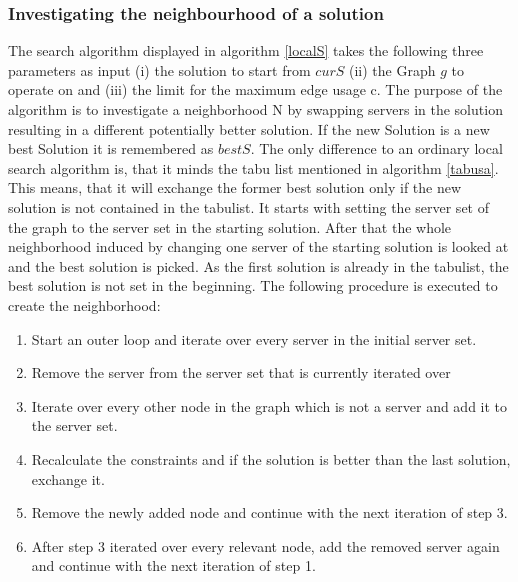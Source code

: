 \documentclass [12pt]{article}
\begin{document}
\subsubsection{Investigating the neighbourhood of a solution }
The search algorithm displayed in algorithm \ref{localS} takes
the following three parameters as input (i) the solution to start from $curS$
(ii) the Graph $g$ to operate on and (iii) the limit for the maximum edge usage c.
The purpose of the algorithm is to investigate a neighborhood N by swapping servers in the solution
resulting in a different potentially better solution. If the new Solution is a new best Solution it is remembered as $bestS$.
The only difference to an ordinary local search algorithm is, that it minds the tabu list mentioned in algorithm \ref{tabusa}.
This means, that it will exchange the former best solution only if the new solution is not contained in the tabulist.
It starts with setting the server set of the graph to the server set in the starting solution. After that the whole
neighborhood induced by changing one server of the starting solution is looked at and the best solution is picked. As the first solution
is already in the tabulist, the best solution is not set in the beginning.
The following procedure is executed to create the neighborhood:
\begin{enumerate}
  \item{Start an outer loop and iterate over every server in the initial server set.}
  \item{Remove the server from the server set that is currently iterated over}
  \item{Iterate over every other node in the graph which is not a server and add it to the server set.}
  \item{Recalculate the constraints and if the solution is better than the last solution, exchange it.}
  \item{Remove the newly added node and continue with the next iteration of step 3.}
  \item{After step 3 iterated over every relevant node, add the removed server again and continue with the next iteration of step 1.}
\end{enumerate}
\end{document}
